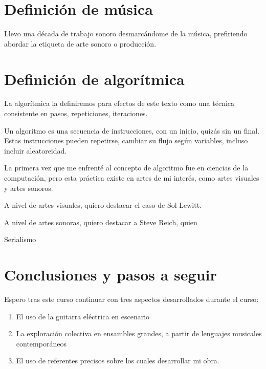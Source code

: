 \documentclass{article}
\begin{document}
\section{Definición de música}

Llevo una década de trabajo sonoro desmarcándome de la música, prefiriendo abordar la etiqueta de arte sonoro o producción.

\clearpage

\section{Definición de algorítmica}

La algorítmica la definiremos para efectos de este texto como una técnica consistente en pasos, repeticiones, iteraciones.

Un algoritmo es una secuencia de instrucciones, con un inicio, quizás sin un final. Estas instrucciones pueden repetirse, cambiar su flujo según variables, incluso incluir aleatoreidad.

La primera vez que me enfrenté al concepto de algoritmo fue en ciencias de la computación, pero esta práctica existe en artes de mi interés, como artes visuales y artes sonoros.

A nivel de artes visuales, quiero destacar el caso de Sol Lewitt.

A nivel de artes sonoras, quiero destacar a Steve Reich, quien 

Serialismo

\clearpage


\section{Conclusiones y pasos a seguir}

Espero tras este curso continuar con tres aspectos desarrollados durante el curso:

\begin{enumerate}
    \item El uso de la guitarra eléctrica en escenario
    \item La exploración colectiva en ensambles grandes, a partir de lenguajes musicales contemporáneos
    \item El uso de referentes precisos sobre los cuales desarrollar mi obra.
\end{enumerate}



\clearpage

\printbibliography[title={Bibliografía}, heading=bibintoc]
\end{document}
